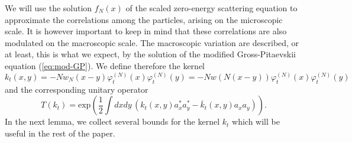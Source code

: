 \documentclass[11pt,a4paper]{article}
\newcommand{\ph}{\varphi_t^{(N)}}	%
\begin{document}

We will use the solution $f_N (x)$ of the scaled zero-energy scattering equation to approximate the correlations among the particles, arising on the microscopic scale. It is however important to keep in mind that these correlations are also modulated on the macroscopic scale. The macroscopic variation are described, or at least, this is what we expect, by the solution of the modified Gross-Pitaevskii equation (\ref{eq:mod-GP}). We define therefore the kernel
\begin{equation}\label{eq:kt} 
k_t (x,y)  = - N w_N (x-y) \ph (x) \ph (y) = - N w (N (x-y)) \ph (x) \ph (y) \end{equation}
and the corresponding unitary operator
 \[ T (k_t) = \text{exp} \left( \frac{1}{2} \int dx dy \, \left( k_t (x,y) a_x^* a_y^* - \overline{k}_t (x,y) a_x a_y \right)\right). \]
In the next lemma, we collect several bounds for the kernel $k_t$ which will be useful in the rest of the paper. 
\end{document}

